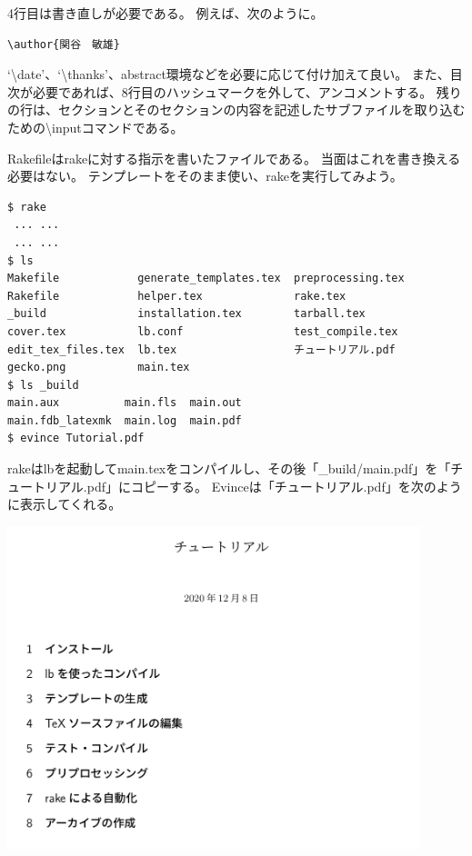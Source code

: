 4行目は書き直しが必要である。
例えば、次のように。
\begin{verbatim}
\author{関谷　敏雄}
\end{verbatim}
`{\textbackslash}date'、`{\textbackslash}thanks'、abstract環境などを必要に応じて付け加えて良い。
また、目次が必要であれば、8行目のハッシュマークを外して、アンコメントする。
残りの行は、セクションとそのセクションの内容を記述したサブファイルを取り込むための{\textbackslash}inputコマンドである。

Rakefileはrakeに対する指示を書いたファイルである。
当面はこれを書き換える必要はない。
テンプレートをそのまま使い、rakeを実行してみよう。
\begin{verbatim}
$ rake
 ... ...
 ... ...
$ ls
Makefile            generate_templates.tex  preprocessing.tex
Rakefile            helper.tex              rake.tex
_build              installation.tex        tarball.tex
cover.tex           lb.conf                 test_compile.tex
edit_tex_files.tex  lb.tex                  チュートリアル.pdf
gecko.png           main.tex
$ ls _build
main.aux          main.fls  main.out
main.fdb_latexmk  main.log  main.pdf
$ evince Tutorial.pdf
\end{verbatim}
rakeはlbを起動してmain.texをコンパイルし、その後「\_build/main.pdf」を「チュートリアル.pdf」にコピーする。
Evinceは「チュートリアル.pdf」を次のように表示してくれる。
\begin{center}
\includegraphics[width=12cm]{Tutorial_1.png}
\end{center}


